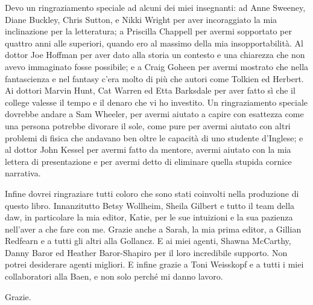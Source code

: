 Devo un ringraziamento speciale ad alcuni dei miei insegnanti: ad Anne
Sweeney, Diane Buckley, Chris Sutton, e Nikki Wright per aver
incoraggiato la mia inclinazione per la letteratura; a Priscilla
Chappell per avermi sopportato per quattro anni alle superiori, quando
ero al massimo della mia insopportabilità. Al dottor Joe Hoffman per
aver dato alla storia un contesto e una chiarezza che non avevo
immaginato fosse possibile; e a Craig Goheen per avermi mostrato che
nella fantascienza e nel fantasy c'era molto di più che autori come
Tolkien ed Herbert. Ai dottori Marvin Hunt, Cat Warren ed Etta Barksdale
per aver fatto sì che il college valesse il tempo e il denaro che vi ho
investito. Un ringraziamento speciale dovrebbe andare a Sam Wheeler, per
avermi aiutato a capire con esattezza come una persona potrebbe divorare
il sole, come pure per avermi aiutato con altri problemi di fisica che
andavano ben oltre le capacità di uno studente d'Inglese; e al dottor
John Kessel per avermi fatto da mentore, avermi aiutato con la mia
lettera di presentazione e per avermi detto di eliminare quella stupida
cornice narrativa.

Infine dovrei ringraziare tutti coloro che sono stati coinvolti nella
produzione di questo libro. Innanzitutto Betsy Wollheim, Sheila Gilbert
e tutto il team della \foreignlanguage{italian}{daw}, in particolare la
mia editor, Katie, per le sue intuizioni e la sua pazienza nell'aver a
che fare con me. Grazie anche a Sarah, la mia prima editor, a Gillian
Redfearn e a tutti gli altri alla Gollancz. E ai miei agenti, Shawna
McCarthy, Danny Baror ed Heather Baror-Shapiro per il loro incredibile
supporto. Non potrei desiderare agenti migliori. E infine grazie a Toni
Weisskopf e a tutti i miei collaboratori alla Baen, e non solo perché mi
danno lavoro.

Grazie.

\newpage
